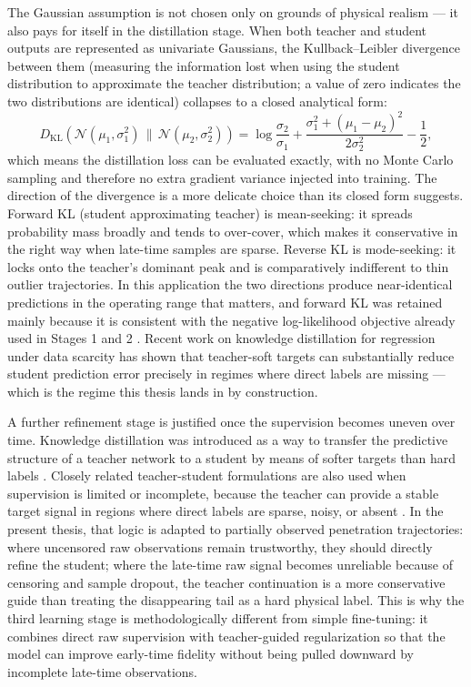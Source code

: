 \documentclass[english, 12pt, a4paper, elec, utf8, a-2b, online]{aaltothesis}
\begin{document}
The Gaussian assumption is not chosen only on grounds of physical realism 
--- it also pays for itself in the distillation stage. 
When both teacher and student outputs are represented as univariate Gaussians, the Kullback--Leibler divergence between them (measuring the information lost when using the student distribution to approximate the teacher distribution; a value of zero indicates the two distributions are identical) 
collapses to a closed analytical form:
\[
D_{\mathrm{KL}}\!\left(\mathcal{N}(\mu_1,\sigma_1^2)\,\|\,\mathcal{N}(\mu_2,\sigma_2^2)\right)
=\log\frac{\sigma_2}{\sigma_1}+\frac{\sigma_1^2+(\mu_1-\mu_2)^2}{2\sigma_2^2}-\frac{1}{2},
\]
which means the distillation loss can be evaluated exactly, with no Monte Carlo sampling and therefore no extra gradient variance injected into training. 
The direction of the divergence is a more delicate choice than its closed form suggests. 
Forward KL (student approximating teacher) is mean-seeking: 
it spreads probability mass broadly and tends to over-cover, which makes it conservative in the right way when late-time samples are sparse. 
Reverse KL is mode-seeking: it locks onto the teacher's dominant peak and is comparatively indifferent to thin outlier trajectories. 
In this application the two directions produce near-identical predictions in the operating range that matters, 
and forward KL was retained mainly because it is consistent with the negative log-likelihood objective already used in Stages 1 and 2 
\cite{BishopPRML2006,KendallGal2017}.
Recent work on knowledge distillation for regression under data scarcity has shown that teacher-soft targets can substantially 
reduce student prediction error precisely in regimes where direct labels are missing \cite{KangKang2024KDRegression} 
--- which is the regime this thesis lands in by construction.

A further refinement stage is justified once the supervision becomes uneven over time. 
Knowledge distillation was introduced as a way to transfer the predictive structure of a teacher network to a student 
by means of softer targets than hard labels \cite{HintonVinyalsDean2015}. 
Closely related teacher-student formulations are also used when supervision is limited or incomplete, 
because the teacher can provide a stable target signal in regions where direct labels are sparse, noisy, or absent \cite{TarvainenValpola2017}. 
In the present thesis, that logic is adapted to partially observed penetration trajectories: 
where uncensored raw observations remain trustworthy, they should directly refine the student; 
where the late-time raw signal becomes unreliable because of censoring and sample dropout, 
the teacher continuation is a more conservative guide than treating the disappearing tail as a hard physical label. 
This is why the third learning stage is methodologically different from simple fine-tuning: 
it combines direct raw supervision with teacher-guided regularization so that the model can improve early-time fidelity 
without being pulled downward by incomplete late-time observations.
\end{document}
